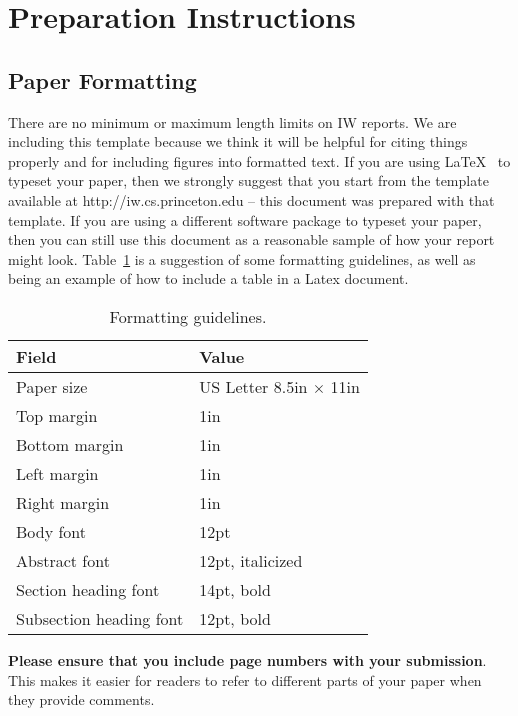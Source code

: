 \documentclass[pageno]{jpaper}
\begin{document}
\section{Preparation Instructions}

\subsection{Paper Formatting}

There are no minimum or maximum length limits on IW reports.
We are including this template because we think it will be helpful
for citing things properly and for including figures into formatted
text.  If you are using \LaTeX~\cite{lamport94}
to typeset your paper, then we strongly suggest
that you start from the template available at
http://iw.cs.princeton.edu -- this
document was prepared with that template.
If you are using a different software package to typeset your paper,
then you can still use this document as a reasonable sample of
how your report might look.  Table~\ref{table:formatting} is a suggestion
of some formatting guidelines, as well as being an example of how to
include a table in a Latex document.

\begin{table}[h!]
  \centering
  \begin{tabular}{|l|l|}
    \hline
    \textbf{Field} & \textbf{Value}\\
    \hline
    \hline
    Paper size & US Letter 8.5in $\times$ 11in\\
    \hline
    Top margin & 1in\\
    \hline
    Bottom margin & 1in\\
    \hline
    Left margin & 1in\\
    \hline
    Right margin & 1in\\
    \hline
    Body font & 12pt\\
    \hline
    Abstract font & 12pt, italicized\\
    \hline
    Section heading font & 14pt, bold\\
    \hline
    Subsection heading font & 12pt, bold\\
    \hline
  \end{tabular}
  \caption{Formatting guidelines. }
  \label{table:formatting}
\end{table}

\textbf{Please ensure that you include page numbers with your
submission}. This makes it easier for readers to refer to
different parts of your paper when they provide comments.
\end{document}
